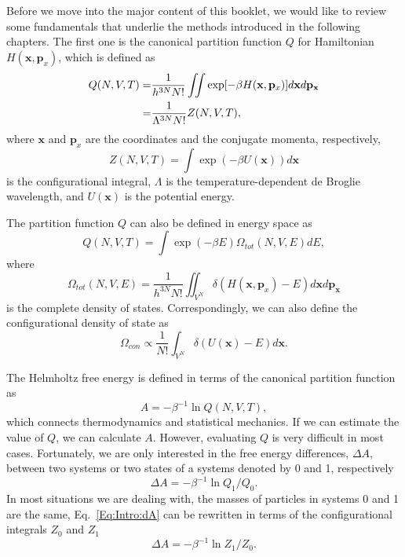 Before we move into the major content of this booklet, we would like to review some fundamentals that underlie the methods introduced in the following chapters. The first one is the canonical partition function $Q$ for Hamiltonian $H(\mathbf{x},\mathbf{p}_{x})$, which is defined as
\begin{align}
  Q(N,V,T)=&\frac{1}{{h}^{3N}N!} \iint \exp[-\beta H(\mathbf{x},\mathbf{p}_{x})] d\mathbf{x}d\mathbf{p}_\mathbf{x}\notag\\
         =&\frac{1}{\Lambda^{3N}N!}Z(N,V,T),
\end{align}
where $\mathbf{x}$ and $\mathbf{p}_{x}$ are the coordinates and the conjugate momenta, respectively,
\begin{equation}
	Z(N,V,T)=\int \exp{\left(-\beta U(\mathbf{x})\right)}d\mathbf{x}
\end{equation}
is the configurational integral, $\Lambda$ is the temperature-dependent de Broglie wavelength, and $U(\mathbf{x})$ is the potential energy.

The partition function $Q$ can also be defined in energy space as
\begin{equation}
	Q(N,V,T)=\int \exp{\left(-\beta E\right)}\varOmega_{tot}(N,V,E)dE,
\end{equation}
where
\begin{equation}
	\varOmega_{tot}(N,V,E)=\frac{1}{{h}^{3N}N!}\iint_{V^N} \delta(H(\mathbf{x},\mathbf{p}_{x})-E)d\mathbf{x}d\mathbf{p}_\mathbf{x}
\end{equation}
is the complete density of states. Correspondingly, we can also define the configurational density of state as
\begin{equation}
	\varOmega_{con}\propto\frac{1}{N!}\int_{V^N} \delta(U(\mathbf{x})-E)d\mathbf{x}.
\end{equation}

The Helmholtz free energy is defined in terms of the canonical partition function as
\begin{equation}
A=-\beta^{-1}\ln{Q(N,V,T)},
\end{equation}
which connects thermodynamics and statistical mechanics. If we can estimate the value of $Q$, we can calculate $A$. However, evaluating $Q$ is very difficult in most cases. Fortunately, we are only interested in the free energy differences, $\Delta A$, between two systems or two states of a systems denoted by 0 and 1, respectively
\begin{equation}
\Delta A=-\beta^{-1}\ln{Q_1/Q_0}.
\label{Eq:Intro:dA}
\end{equation}
In most situations we are dealing with, the masses of particles in systems 0 and 1 are the same, Eq.~\ref{Eq:Intro:dA} can be rewritten in terms of the configurational integrals $Z_0$ and $Z_1$
\begin{equation}
\Delta A=-\beta^{-1}\ln{Z_1/Z_0}.
\end{equation}

